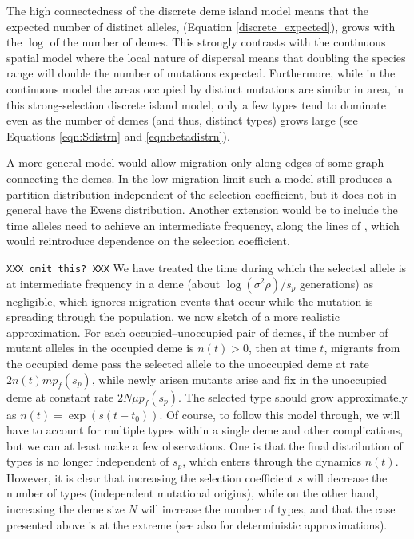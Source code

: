 \documentclass{article}
\begin{document}
The high connectedness of the discrete deme island model means that the expected number of distinct alleles, (Equation \eqref{discrete_expected}), 
grows with the $\log$ of the number of demes. This strongly contrasts with the continuous spatial model where the local nature of dispersal means that doubling the species range will double the number of mutations expected. 
Furthermore, while in the continuous model the areas occupied by distinct mutations are similar in area, in this strong-selection discrete island model, 
only a few types tend to dominate even as the number of demes (and thus, distinct types) grows large (see Equations \eqref{eqn:Sdistrn} and \eqref{eqn:betadistrn}).

A more general model would allow migration only along edges of some graph connecting the demes.
In the low migration limit such a model still produces a partition distribution independent of the selection coefficient,
but it does not in general have the Ewens distribution.
Another extension would be to include the time alleles need to achieve an intermediate frequency,
along the lines of \citet{Navarro:03}, which would reintroduce dependence on the selection coefficient.

\texttt{XXX omit this? XXX}
We have treated the time during which the selected allele is at intermediate frequency in a deme (about $\log(\sigma^2 \rho)/s_p$ generations) as negligible, 
which ignores migration events that occur while the mutation is spreading through the population. 
we now sketch of a more realistic approximation.
For each occupied--unoccupied pair of demes, if the number of mutant alleles in the occupied deme is $n(t)>0$,
then at time $t$, migrants from the occupied deme pass the selected allele to the unoccupied deme at rate $2 n(t) m p_f(s_p)$,
while newly arisen mutants arise and fix in the unoccupied deme at constant rate $2 N \mu p_f(s_p)$.
The selected type should grow approximately as $n(t)=\exp(s(t-t_0))$.
Of course, to follow this model through, we will have to account for multiple types within a single deme and other complications,
but we can at least make a few observations.
One is that the final distribution of types is no longer independent of $s_p$, which enters through the dynamics $n(t)$.
However, it is clear that increasing the selection coefficient $s$ will decrease the number of types (independent mutational origins),
while on the other hand, increasing the deme size $N$ will increase the number of types,
and that the case presented above is at the extreme (see also \cite{Navarro:03} for deterministic approximations). 
\end{document}
